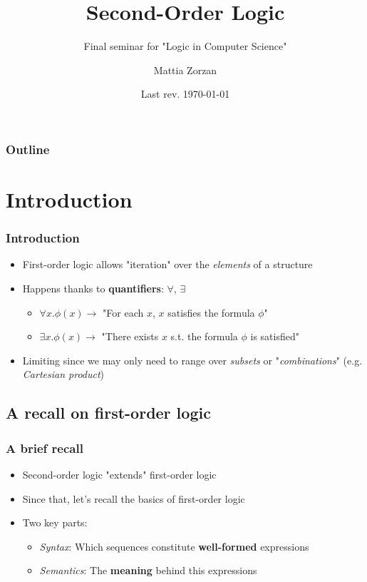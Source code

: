 \documentclass{beamer}
\title{Second-Order Logic}
\subtitle{Final seminar for "Logic in Computer Science"}
\author{Mattia Zorzan}
\institute{University of Verona}
\date{Last rev. \today}
\begin{document}
    \begin{frame}
        \titlepage
    \end{frame}

    \begin{frame}
        \frametitle{Outline}
        \tableofcontents
    \end{frame}

    \section{Introduction}
        \begin{frame}
            \frametitle{Introduction}
            \begin{itemize}
                \item First-order logic allows "iteration" over the \textit{elements} of a structure
                \item Happens thanks to \textbf{quantifiers}: $ \forall $, $ \exists $
                    \begin{itemize}
                        \item $ \forall x. \phi(x) \rightarrow $ "For each $ x $, $ x $ satisfies the formula $ \phi $"
                        \item $ \exists x. \phi(x) \rightarrow $ "There exists $ x $ s.t. the formula $ \phi $ is satisfied"
                    \end{itemize}
                \item Limiting since we may only need to range over \textit{subsets} or "\textit{combinations}" (e.g. \textit{Cartesian product})
            \end{itemize}
        \end{frame}

        \subsection{A recall on first-order logic}
            \begin{frame}
                \frametitle{A brief recall}
                \begin{itemize}
                    \item Second-order logic "extends" first-order logic
                    \item Since that, let's recall the basics of first-order logic
                    \item Two key parts:
                        \begin{itemize}
                            \item \textit{Syntax}: Which sequences constitute \textbf{well-formed} expressions
                            \item \textit{Semantics}: The \textbf{meaning} behind this expressions
                        \end{itemize}
                \end{itemize}
            \end{frame}
\end{document}
